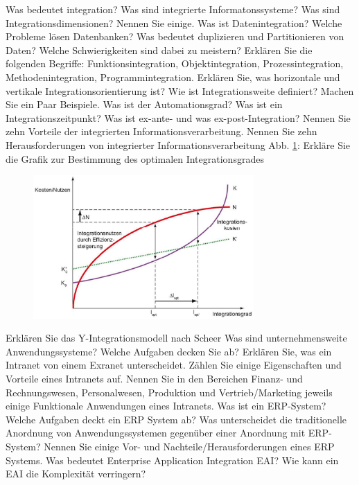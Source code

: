 \documentclass[ngerman,a4paper,12pt]{scrreprt}
\begin{document}
\olR
	\li Was bedeutet integration? Was sind integrierte Informatonssysteme?
	\li Was sind Integrationsdimensionen? Nennen Sie einige.
	\li Was ist Datenintegration?
	\li Welche Probleme lösen Datenbanken?
	\li Was bedeutet duplizieren und Partitionieren von Daten? Welche Schwierigkeiten sind dabei zu meistern?
	\li Erklären Sie die folgenden Begriffe: Funktionsintegration, Objektintegration, Prozessintegration, Methodenintegration, Programmintegration.
	\li Erklären Sie, was horizontale und vertikale Integrationsorientierung ist?
	\li Wie ist Integrationsweite definiert? Machen Sie ein Paar Beispiele.
	\li Was ist der Automationsgrad?
	\li Was ist ein Integrationszeitpunkt? Was ist ex-ante- und was ex-post-Integration?
	\li Nennen Sie zehn Vorteile der integrierten Informationsverarbeitung.
	\li Nennen Sie zehn Herausforderungen von integrierter Informationsverarbeitung
	\li Abb. \ref{optIntegrGrad}: Erkläre Sie die Grafik zur Bestimmung des optimalen Integrationsgrades
		\begin{figure}[H]
			\centering
			\includegraphics[width=0.75\textwidth]{img/V9.1.jpg}
			\caption{}
			\label{optIntegrGrad}
		\end{figure}
	\li Erklären Sie das Y-Integrationsmodell nach Scheer
	\li Was sind unternehmensweite Anwendungssysteme? Welche Aufgaben decken Sie ab?
	\li Erklären Sie, was ein Intranet von einem Exranet unterscheidet. Zählen Sie einige Eigenschaften und Vorteile eines Intranets auf.
	\li Nennen Sie in den Bereichen Finanz- und Rechnungswesen, Personalwesen, Produktion und Vertrieb/Marketing jeweils einige Funktionale Anwendungen eines Intranets.
	\li Was ist ein ERP-System? Welche Aufgaben deckt ein ERP System ab?
	\li Was unterscheidet die traditionelle Anordnung von Anwendungssystemen gegenüber einer Anordnung mit ERP-System?
	\li Nennen Sie einige Vor- und Nachteile/Herausforderungen eines ERP Systems.
	\li Was bedeutet Enterprise Application Integration EAI?
	\li Wie kann ein EAI die Komplexität verringern?
\olS
\end{document}
